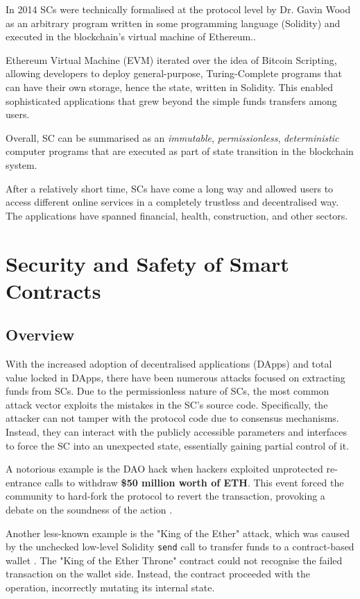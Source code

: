 \documentclass[oneside]{ecsproject}     %
\begin{document}
In 2014 SCs were technically formalised at the protocol level by Dr. Gavin Wood as an arbitrary program
written in some programming language (Solidity) and executed in the blockchain's virtual machine of Ethereum.\cite{eth_yellow_paper}.

Ethereum Virtual Machine (EVM) iterated over the idea of Bitcoin Scripting, allowing developers to deploy general-purpose, Turing-Complete
programs that can have their own storage, hence the state, written in Solidity\cite{solidity_docs}. This enabled sophisticated applications that grew beyond
the simple funds transfers among users.

Overall, SC can be summarised as an \textit{immutable}, \textit{permissionless}, \textit{deterministic} computer programs 
that are executed as part of state transition in the blockchain system. 

After a relatively short time, SCs have come a long way and allowed users to access different online services in a completely trustless and decentralised way.
The applications have spanned financial, health, construction\cite{cad_blockchain}, and other sectors. 

\chapter{Security and Safety of Smart Contracts}

\section{Overview}

With the increased adoption of decentralised applications (DApps) and total value locked in DApps, 
there have been numerous attacks focused on extracting funds from SCs. 
Due to the permissionless nature of SCs, the most common attack vector exploits the mistakes in the SC's source code.
Specifically, the attacker can not tamper with the protocol code due to consensus mechanisms.
Instead, they can interact with the publicly accessible parameters and interfaces to force the SC into an unexpected state, essentially gaining partial control of it.

A notorious example is the DAO hack when hackers exploited unprotected re-entrance calls to withdraw \textbf{\$50 million worth of ETH}. 
This event forced the community to hard-fork the protocol to revert the transaction, provoking a debate on the soundness of the action \cite{the_dao}.

Another less-known example is the "King of the Ether" attack, which was caused by the unchecked low-level Solidity \texttt{send} call to transfer funds to a contract-based wallet \cite{king_of_the_ether}.
The "King of the Ether Throne" contract could not recognise the failed transaction on the wallet side. Instead, the contract proceeded with the operation, incorrectly mutating its internal state.
\end{document}
